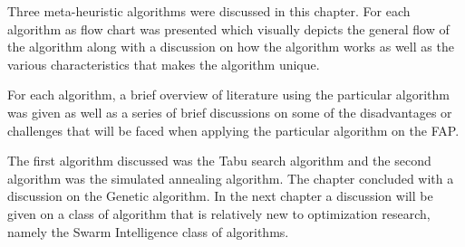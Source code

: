 Three meta-heuristic algorithms were discussed in this chapter. For each algorithm as flow chart was presented which visually depicts the general flow of the algorithm along with a discussion on how the algorithm works as well as the various characteristics that makes the algorithm unique.

For each algorithm, a brief overview of literature using the particular algorithm was given as well as a series of brief discussions on some of the disadvantages or challenges that will be faced when applying the particular algorithm on the FAP.

The first algorithm discussed was the Tabu search algorithm and the second algorithm was the simulated annealing algorithm. The chapter concluded with a discussion on the Genetic algorithm. In the next chapter a discussion will be given on a class of algorithm that is relatively new to optimization research, namely the Swarm Intelligence class of algorithms.
